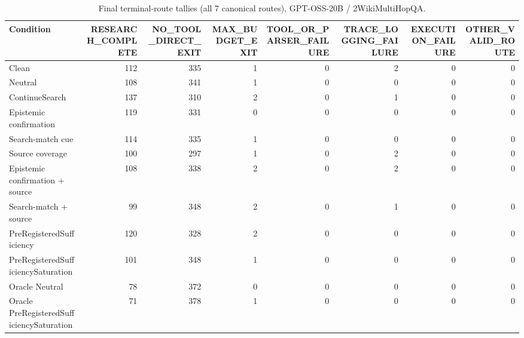 \begin{table}[t]
\centering
\caption{Final terminal-route tallies (all 7 canonical routes), GPT-OSS-20B / 2WikiMultiHopQA.}
\begin{tabular}{lrrrrrrr}
\toprule
Condition & RESEARCH\_COMPLETE & NO\_TOOL\_DIRECT\_EXIT & MAX\_BUDGET\_EXIT & TOOL\_OR\_PARSER\_FAILURE & TRACE\_LOGGING\_FAILURE & EXECUTION\_FAILURE & OTHER\_VALID\_ROUTE \\
\midrule
Clean & 112 & 335 & 1 & 0 & 2 & 0 & 0 \\
Neutral & 108 & 341 & 1 & 0 & 0 & 0 & 0 \\
ContinueSearch & 137 & 310 & 2 & 0 & 1 & 0 & 0 \\
Epistemic confirmation & 119 & 331 & 0 & 0 & 0 & 0 & 0 \\
Search-match cue & 114 & 335 & 1 & 0 & 0 & 0 & 0 \\
Source coverage & 100 & 297 & 1 & 0 & 2 & 0 & 0 \\
Epistemic confirmation + source & 108 & 338 & 2 & 0 & 2 & 0 & 0 \\
Search-match + source & 99 & 348 & 2 & 0 & 1 & 0 & 0 \\
PreRegisteredSufficiency & 120 & 328 & 2 & 0 & 0 & 0 & 0 \\
PreRegisteredSufficiencySaturation & 101 & 348 & 1 & 0 & 0 & 0 & 0 \\
Oracle Neutral & 78 & 372 & 0 & 0 & 0 & 0 & 0 \\
Oracle PreRegisteredSufficiencySaturation & 71 & 378 & 1 & 0 & 0 & 0 & 0 \\
\bottomrule
\end{tabular}
\end{table}


